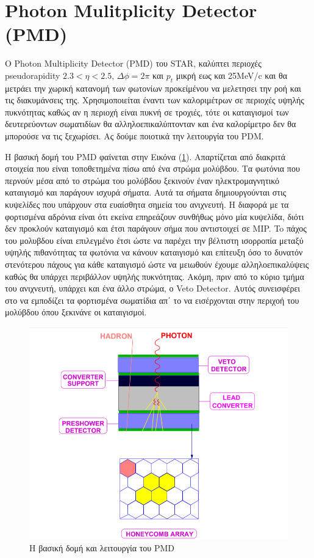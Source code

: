 \section{Photon Mulitplicity Detector (PMD)}

	Ο Photon Multiplicity Detector (PMD) του STAR, καλύπτει περιοχές pseudorapidity $2.3<\eta<2.5$, $\Delta \phi=2\pi$ και $p_t$ μικρή εως και 25MeV/c και θα μετράει την χωρική κατανομή των φωτονίων προκείμένου να μελετησει την ροή και τις διακυμάνσεις της.
	Χρησιμοποιείται έναντι των καλοριμέτρων σε περιοχές υψηλής πυκνότητας καθώς αν η περιοχή είναι πυκνή σε τροχιές, τότε οι καταιγισμοί των δευτερεύοντων σωματιδίων θα αλληλοεπικαλύπτονταν και ένα καλορίμετρο δεν θα μπορούσε να τις ξεχωρίσει. 
	Ας δούμε ποιοτικά την λειτουργία του PDM. 
	
	Η βασική δομή του PMD φαίνεται στην Εικόνα (\ref{fig3.24}).   
     Απαρτίζεται από διακριτά στοιχεία που είναι τοποθετημένα πίσω από ένα στρώμα μολύβδου. Τα φωτόνια που περνούν μέσα από το στρώμα του μολύβδου ξεκινούν έναν ηλεκτρομαγνητικό καταιγισμό και παράγουν ισχυρά σήματα. Αυτά τα σήματα δημιουργούνται στις κυψελίδες που υπάρχουν στα ευαίσθητα σημεία του ανιχνευτή. Η διαφορά με τα φορτισμένα αδρόνια είναι ότι εκείνα επηρεάζουν συνθήθως μόνο μία κυψελίδα, διότι δεν προκλούν καταιγισμό και έτσι παράγουν σήμα που αντιστοιχεί σε MIP. 
	To πάχος του μολυβδου είναι επιλεγμένο έτσι ώστε να παρέχει την βέλτιστη ισορροπία μεταξύ υψηλής πιθανότητας τα φωτόνια να κάνουν καταιγισμό και επίτευξη όσο το δυνατόν στενότερου πάχους για κάθε καταιγισμό ώστε να μειωθούν έχουμε αλληλοεπικαλύψεις καθώς θα υπάρχει περιβάλλον υψηλής πυκνότητας.
	Ακόμη, πριν από το κύριο τμήμα του ανιχνευτή, υπάρχει και ένα άλλο στρώμα, ο Veto Detector. Αυτός συνεισφέρει στο να εμποδίζει τα φορτισμένα σωματίδια απ΄ το να εισέρχονται στην περιχοή του μολύβδου όπου ξεκινάνε οι καταιγισμοί.
	\begin{figure}[h!]
		\centering
		\includegraphics[scale=0.4]{STAR_Detectors/PMD_principle}
		\caption{Η βασική δομή και λειτουργία του PMD}
		\label{fig3.24}
	\end{figure}
	
